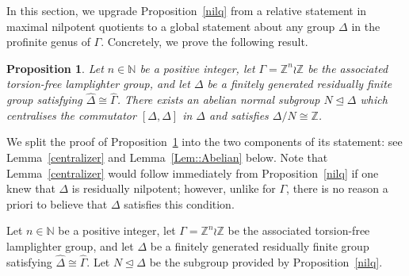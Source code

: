 \documentclass{amsart}
\numberwithin{theorem}{section}
\numberwithin{equation}{section}
\newtheorem{proposition}[theorem]{Proposition}
\newcommand{\Z}{\mathbb{Z}}
\newcommand{\hD}{\widehat{\Delta}}
\newcommand{\hG}{\widehat{\Gamma}}
\begin{document}
In this section, we upgrade Proposition~\ref{nilq} from a relative statement in maximal nilpotent quotients to a global statement about any group $\Delta$ in the profinite genus of $\Gamma$. Concretely, we prove the following result. 
\begin{proposition}\label{Prop::LiftingCentralisers}
    Let $n \in \mathbb{N}$ be a positive integer, let $\Gamma = \Z^n \wr \Z$ be the associated torsion-free lamplighter group, and let $\Delta$ be a finitely generated residually finite group satisfying $\hD \cong \hG$. There exists an abelian normal subgroup $N \trianglelefteq \Delta$ which centralises the commutator $[\Delta,\Delta]$ in $\Delta$ and satisfies $\Delta / N \cong \Z$.
\end{proposition}
We split the proof of Proposition~\ref{Prop::LiftingCentralisers} into the two components of its statement: see Lemma~\ref{centralizer} and Lemma~\ref{Lem::Abelian} below. Note that Lemma~\ref{centralizer} would follow immediately from Proposition~\ref{nilq} if one knew that $\Delta$ is residually nilpotent; however, unlike for $\Gamma$, there is no reason a priori to believe that $\Delta$ satisfies this condition.

Let $n \in \mathbb{N}$ be a positive integer, let $\Gamma = \Z^n \wr \Z$ be the associated torsion-free lamplighter group, and let $\Delta$ be a finitely generated residually finite group satisfying $\hD \cong \hG$. Let $N \trianglelefteq \Delta$ be the subgroup provided by Proposition~\ref{nilq}.
\end{document}
